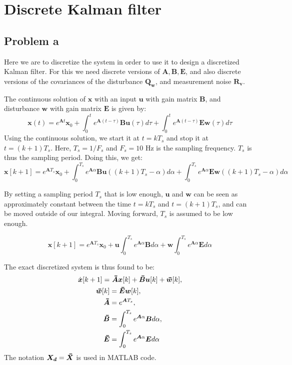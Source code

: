 \section{Discrete Kalman filter}
\subsection{Problem a}
Here we are to discretize the system in order to use it to design a discretized Kalman filter. For this we need discrete versions of $\bm{A}, \bm{B}, \bm{E}$, and also discrete versions of the covariances of the disturbance $\bm{Q_w}$, and measurement noise $\bm{R_v}$.

The continuous solution of $\bm{x}$ with an input $\bm{u}$ with gain matrix $\bm{B}$, and disturbance $\bm{w}$ with gain matrix $\bm{E}$ is given by:
\begin{equation*}
\bm{x}(t) = e^{\bm{A}t}\bm{x}_0 + \int_0^te^{\bm{A}(t-\tau)}\bm{Bu}(\tau)d\tau + \int_0^te^{\bm{A}(t-\tau)}\bm{Ew}(\tau)d\tau
\end{equation*}
Using the continuous solution, we start it at $t=kT_s$ and stop it at $t=(k+1)T_s$. Here, $T_s = 1/F_s$ and $F_s = 10$ Hz is the sampling frequency. $T_s$ is thus the sampling period. Doing this, we get:
\begin{equation}
\bm{x}[k+1] = e^{\bm{A}T_s}\bm{x}_0 + \int_0^{T_s} e^{\bm{A}\alpha}\bm{Bu}((k+1)T_s -\alpha)d\alpha + \int_0^{T_s} e^{\bm{A}\alpha}\bm{Ew}((k+1)T_s -\alpha)d\alpha \label{x_disc}
\end{equation}

By setting a sampling period $T_s$ that is low enough, $\bm{u}$ and $\bm{w}$ can be seen as approximately constant between the time $t = kT_s$ and $t = (k+1)T_s$, and can be moved outside of our integral. Moving forward, $T_s$ is assumed to be low enough.

\begin{equation}
\bm{x}[k+1] = e^{\bm{A}T_s}\bm{x}_0 + \bm{u}\int_0^{T_s} e^{\bm{A}\alpha}\bm{B}d\alpha + \bm{w}\int_0^{T_s} e^{\bm{A}\alpha}\bm{E}d\alpha \label{x_disc_const}
\end{equation}

The exact discretized system is thus found to be:
\begin{subequations}
\begin{align}
    \dot{\bm{x}}[k+1] =& \ \thickbar{\bm{A}}\bm{x}[k]+\thickbar{\bm{B}}\bm{u}[k] + \thickbar{\bm{w}}[k], \\
    \thickbar{\bm{w}}[k] &= \thickbar{\bm{E}}\bm{w}[k], \label{w_bar} \\
    \thickbar{\bm{A}} &= e^{\bm{A}T_s}, \\
    \thickbar{\bm{B}} &= \int_{0}^{T_s}e^{\bm{A}\alpha}\bm{B}d\alpha \label{B_d}, \\
    \thickbar{\bm{E}} &= \int_{0}^{T_s}e^{\bm{A}\alpha}\bm{E}d\alpha \label{E_d}
\end{align}
\end{subequations}
The notation $\bm{X_d} = \thickbar{\bm{X}}$ is used in MATLAB code.

